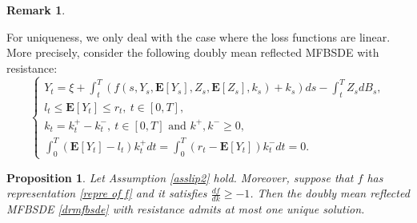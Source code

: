 \documentclass[10pt]{article}%
\numberwithin{equation}{section}
\newtheorem{proposition}[theorem]{Proposition}
\newtheorem{remark}[theorem]{Remark}
\begin{document}
\begin{remark}

\end{remark}

For uniqueness, we only deal with the case where the loss functions are linear. More precisely, consider the following doubly mean reflected MFBSDE with resistance:
\begin{equation}\label{drmfbsde}
\begin{cases}
Y_t=\xi+\int_t^T \left(f(s,Y_s,\mathbf{E}[Y_s],Z_s,\mathbf{E}[Z_s],k_s)+k_s \right)ds-\int_t^T Z_s dB_s, \\
l_t\leq \mathbf{E}[Y_t]\leq r_t, \ t\in[0,T],\\ 
{k_t=k^+_t-k^-_t, \ t\in[0,T] \textrm{ and }k^+,k^-\geq 0,}\\
\int_0^T (\mathbf{E}[Y_t]-l_t)k_t^{+}dt=\int_0^T (r_t-\mathbf{E}[Y_t])k_t^{-}dt=0.
\end{cases}
\end{equation}

\begin{proposition}\label{prounik}
Let Assumption \ref{asslip2} hold. Moreover, suppose that $f$ has representation \eqref{repre of f} and it satisfies $\frac{df}{dk}\geq-1$. %
   Then the doubly mean reflected MFBSDE \eqref{drmfbsde} with resistance admits at most one unique solution.
\end{proposition}
\end{document}

